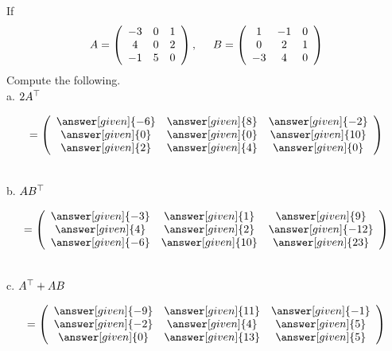 \documentclass{ximera}
\begin{document}
\begin{question}
If
\[
A= \left(\begin{array}{ccc}
-3 & 0 & 1\\
4 & 0 & 2\\
-1 & 5 & 0
\end{array}\right), \hspace{.5cm}
B = \left(\begin{array}{ccc}
1 & -1 & 0\\
0 & 2 & 1\\
-3 & 4 & 0
\end{array}\right)\]
Compute the following. \\

a. $2A^{\top}$ \begin{prompt} \[= \left(\begin{array}{ccc}
\answer[given]{-6} & \answer[given]{8}& \answer[given]{-2}\\
\answer[given]{0} & \answer[given]{0}& \answer[given]{10}\\
\answer[given]{2} & \answer[given]{4}& \answer[given]{0}
\end{array}\right)\]\end{prompt}\\

b. $AB^{\top}$ \begin{prompt} \[= \left(\begin{array}{ccc}
\answer[given]{-3} & \answer[given]{1}& \answer[given]{9}\\
\answer[given]{4} & \answer[given]{2}& \answer[given]{-12}\\
\answer[given]{-6} & \answer[given]{10}& \answer[given]{23}
\end{array}\right)\]\end{prompt}\\

c. $A^{\top} + AB$ \begin{prompt} \[=\left(\begin{array}{ccc}
\answer[given]{-9} & \answer[given]{11}& \answer[given]{-1}\\
\answer[given]{-2} & \answer[given]{4}& \answer[given]{5}\\
\answer[given]{0} & \answer[given]{13}& \answer[given]{5}
\end{array}\right)\]\end{prompt}
\end{question}
\end{document}
